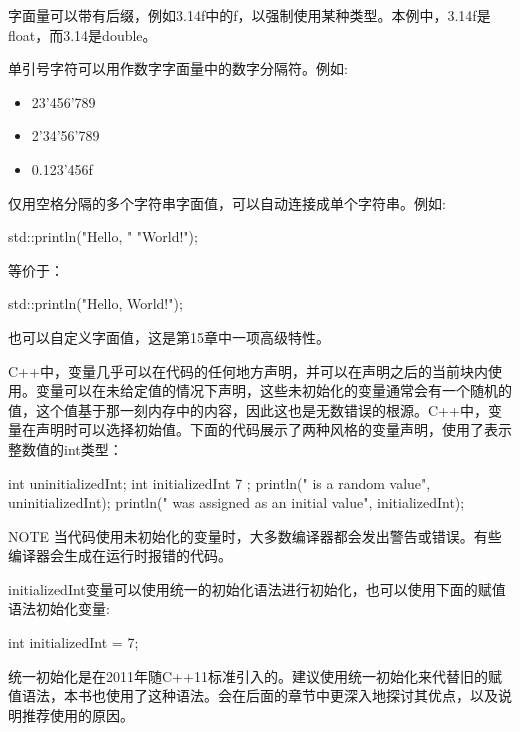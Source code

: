 字面量可以带有后缀，例如3.14f中的f，以强制使用某种类型。本例中，3.14f是float，而3.14是double。

单引号字符可以用作数字字面量中的数字分隔符。例如:

\begin{itemize}
\item
23'456'789

\item
2'34'56'789

\item
0.123'456f
\end{itemize}

仅用空格分隔的多个字符串字面值，可以自动连接成单个字符串。例如:

\begin{cpp}
std::println("Hello, "
             "World!");
\end{cpp}

等价于：

\begin{cpp}
std::println("Hello, World!");
\end{cpp}

也可以自定义字面值，这是第15章中一项高级特性。


C++中，变量几乎可以在代码的任何地方声明，并可以在声明之后的当前块内使用。变量可以在未给定值的情况下声明，这些未初始化的变量通常会有一个随机的值，这个值基于那一刻内存中的内容，因此这也是无数错误的根源。C++中，变量在声明时可以选择初始值。下面的代码展示了两种风格的变量声明，使用了表示整数值的int类型：

\begin{cpp}
int uninitializedInt;
int initializedInt { 7 };
println("{} is a random value", uninitializedInt);
println("{} was assigned as an initial value", initializedInt);
\end{cpp}

\begin{myNotic}{NOTE}
当代码使用未初始化的变量时，大多数编译器都会发出警告或错误。有些编译器会生成在运行时报错的代码。
\end{myNotic}

initializedInt变量可以使用统一的初始化语法进行初始化，也可以使用下面的赋值语法初始化变量:

\begin{cpp}
int initializedInt = 7;
\end{cpp}

统一初始化是在2011年随C++11标准引入的。建议使用统一初始化来代替旧的赋值语法，本书也使用了这种语法。会在后面的章节中更深入地探讨其优点，以及说明推荐使用的原因。

